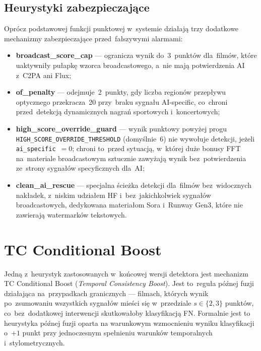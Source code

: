 \subsection*{Heurystyki zabezpieczające}

Oprócz podstawowej funkcji punktowej w~systemie działają trzy
dodatkowe mechanizmy zabezpieczające przed~fałszywymi alarmami:

\begin{itemize}
  \item \textbf{broadcast\_score\_cap} --- ogranicza wynik do~3~punktów
    dla~filmów, które uaktywniły pułapkę wzorca broadcastowego,
    a~nie mają potwierdzenia AI z~C2PA ani Flux;
  \item \textbf{of\_penalty} --- odejmuje~2~punkty, gdy liczba regionów
    przepływu optycznego przekracza~20 przy~braku sygnału AI-specific,
    co~chroni przed~detekcją dynamicznych nagrań sportowych i~koncertowych;
  \item \textbf{high\_score\_override\_guard} --- wynik punktowy powyżej progu
    \texttt{HIGH\_SCORE\_OVERRIDE\_THRESHOLD} (domyślnie~6) nie wywołuje
    detekcji, jeżeli \texttt{ai\_specific}~$= 0$; chroni to~przed sytuacją,
    w~której duże bonusy FFT na~materiale broadcastowym sztucznie zawyżają
    wynik bez~potwierdzenia ze~strony sygnałów specyficznych dla~AI;
  \item \textbf{clean\_ai\_rescue} --- specjalna ścieżka detekcji dla~filmów
    bez~widocznych nakładek, z~niskim udziałem HF i~bez~jakichkolwiek
    sygnałów broadcastowych, dedykowana materiałom Sora i~Runway Gen3,
    które nie zawierają watermarków tekstowych.
\end{itemize}

\section{TC Conditional Boost}
\label{sec:tc_boost}

Jedną z~heurystyk zastosowanych w~końcowej wersji detektora jest mechanizm
TC Conditional Boost (\textit{Temporal Consistency Boost}). Jest to~reguła
późnej fuzji działająca na~przypadkach granicznych --- filmach, których
wynik po~zsumowaniu wszystkich sygnałów mieści się w~przedziale $s \in \{2, 3\}$
punktów, co~bez~dodatkowej interwencji skutkowałoby klasyfikacją FN.
Formalnie jest to heurystyka późnej fuzji oparta na warunkowym
wzmocnieniu wyniku klasyfikacji o~$+1$ punkt przy jednoczesnym spełnieniu
warunków temporalnych i~stylometrycznych.

